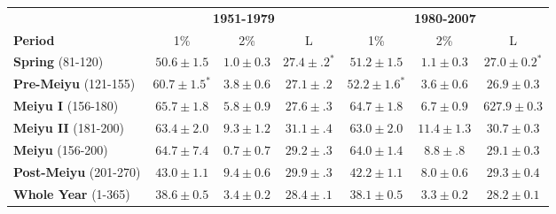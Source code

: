 \documentclass[draft,grl]{AGUTeX}
\begin{document}
\begin{table}
\begin{tabular}{ l c c c c c c}
	& \multicolumn{3}{c}{\textbf{1951-1979}} & \multicolumn{3}{c}{\textbf{1980-2007}} \\
	\textbf{Period} & 1\% & 2\% & L & 1\% & 2\% & L \\
	\hline	
	\textbf{Spring} (81-120) & $50.6 \pm 1.5$ & $1.0 \pm 0.3$ & $\boldsymbol{27.4 \pm .2^*}$ & $51.2 \pm 1.5$ & $1.1 \pm 0.3$ & $\boldsymbol{27.0 \pm 0.2^*}$ \\
	\textbf{Pre-Meiyu} (121-155) & $\boldsymbol{60.7 \pm 1.5^*}$ & $3.8 \pm 0.6$ & $27.1 \pm .2$ & $\boldsymbol{52.2 \pm 1.6^*}$ & $3.6 \pm 0.6$ & $26.9 \pm 0.3$ \\
	\textbf{Meiyu I} (156-180) &	$65.7 \pm 1.8$ & $5.8 \pm 0.9$ & $27.6 \pm .3$ & $64.7 \pm 1.8$  & $6.7 \pm 0.9$ & 6$ 27.9 \pm 0.3$ \\
	\textbf{Meiyu II} (181-200) & $63.4 \pm 2.0$ & $9.3 \pm 1.2$ & $31.1 \pm .4$ & $63.0 \pm 2.0$ & $11.4 \pm 1.3$ & $30.7 \pm 0.3$ \\
	\textbf{Meiyu} (156-200) & $64.7 \pm 7.4$ & $0.7 \pm 0.7$ & $29.2 \pm .3$ & $64.0 \pm 1.4$ & $8.8 \pm .8$ & $29.1 \pm 0.3$ \\
	\textbf{Post-Meiyu} (201-270) & $43.0 \pm 1.1 $ & $9.4 \pm 0.6$ & $\boldsymbol{29.9 \pm .3}$ & $42.2 \pm 1.1$ & $8.0 \pm 0.6$ & $\boldsymbol{29.3 \pm 0.4}$  \\
	\textbf{Whole Year} (1-365) & $38.6 \pm 0.5 $ & $3.4 \pm 0.2 $ & $\boldsymbol{28.4 \pm .1}$ & $38.1 \pm 0.5$ & $3.3 \pm 0.2$ & $\boldsymbol{28.2 \pm 0.1} $ \\
\end{tabular}


\end{table}
\end{document}
